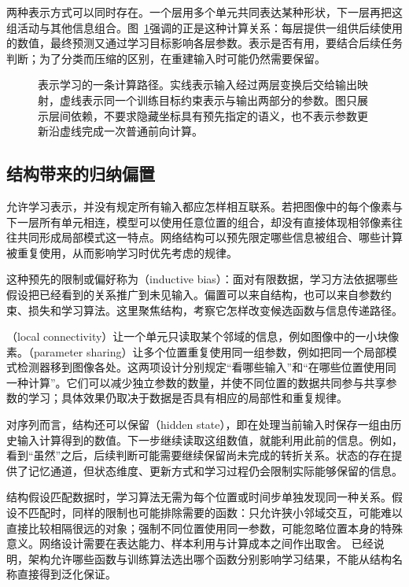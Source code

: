 两种表示方式可以同时存在。一个层用多个单元共同表达某种形状，下一层再把这组活动与其他信息组合。图~\ref{fig:neural-representation-path}强调的正是这种计算关系：每层提供一组供后续使用的数值，最终预测又通过学习目标影响各层参数。表示是否有用，要结合后续任务判断；为了分类而压缩的区别，在重建输入时可能仍然需要保留。

\begin{figure}[htbp]
  \centering
  
  \caption{表示学习的一条计算路径。实线表示输入经过两层变换后交给输出映射，虚线表示同一个训练目标约束表示与输出两部分的参数。图只展示层间依赖，不要求隐藏坐标具有预先指定的语义，也不表示参数更新沿虚线完成一次普通前向计算。}
  \label{fig:neural-representation-path}
\end{figure}

\subsection{结构带来的归纳偏置}
\label{sec:neural-structural-bias}

允许学习表示，并没有规定所有输入都应怎样相互联系。若把图像中的每个像素与下一层所有单元相连，模型可以使用任意位置的组合，却没有直接体现相邻像素往往共同形成局部模式这一特点。网络结构可以预先限定哪些信息被组合、哪些计算被重复使用，从而影响学习时优先考虑的规律。

这种预先的限制或偏好称为（inductive bias）：面对有限数据，学习方法依据哪些假设把已经看到的关系推广到未见输入。偏置可以来自结构，也可以来自参数约束、损失和学习算法。这里聚焦结构，考察它怎样改变候选函数与信息传递路径。

（local connectivity）让一个单元只读取某个邻域的信息，例如图像中的一小块像素。（parameter sharing）让多个位置重复使用同一组参数，例如把同一个局部模式检测器移到图像各处。这两项设计分别规定“看哪些输入”和“在哪些位置使用同一种计算”。它们可以减少独立参数的数量，并使不同位置的数据共同参与共享参数的学习；具体效果仍取决于数据是否具有相应的局部性和重复规律。

对序列而言，结构还可以保留（hidden state），即在处理当前输入时保存一组由历史输入计算得到的数值。下一步继续读取这组数值，就能利用此前的信息。例如，看到“虽然”之后，后续判断可能需要继续保留尚未完成的转折关系。状态的存在提供了记忆通道，但状态维度、更新方式和学习过程仍会限制实际能够保留的信息。

结构假设匹配数据时，学习算法无需为每个位置或时间步单独发现同一种关系。假设不匹配时，同样的限制也可能排除需要的函数：只允许狭小邻域交互，可能难以直接比较相隔很远的对象；强制不同位置使用同一参数，可能忽略位置本身的特殊意义。网络设计需要在表达能力、样本利用与计算成本之间作出取舍。
已经说明，架构允许哪些函数与训练算法选出哪个函数分别影响学习结果，不能从结构名称直接得到泛化保证。

